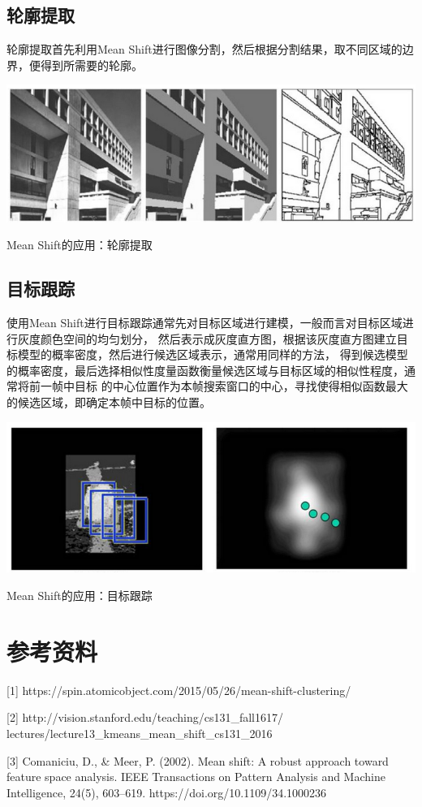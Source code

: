 \documentclass{article}
\begin{document}
\subsection{轮廓提取}
轮廓提取首先利用Mean Shift进行图像分割，然后根据分割结果，取不同区域的边界，便得到所需要的轮廓。
\begin{center}
    \includegraphics[width=\textwidth]{Images/profile.png}

    Mean Shift的应用：轮廓提取
\end{center}


\subsection{目标跟踪}
使用Mean Shift进行目标跟踪通常先对目标区域进行建模，一般而言对目标区域进行灰度颜色空间的均匀划分，
然后表示成灰度直方图，根据该灰度直方图建立目标模型的概率密度，然后进行候选区域表示，通常用同样的方法，
得到候选模型的概率密度，最后选择相似性度量函数衡量候选区域与目标区域的相似性程度，通常将前一帧中目标
的中心位置作为本帧搜索窗口的中心，寻找使得相似函数最大的候选区域，即确定本帧中目标的位置。
\begin{center}
    \includegraphics[width=\textwidth]{Images/tracking.png}

    Mean Shift的应用：目标跟踪
\end{center}

\section{参考资料}
[1] https://spin.atomicobject.com/2015/05/26/mean-shift-clustering/ 

[2] http://vision.stanford.edu/teaching/cs131\_fall1617/
lectures/lecture13\_kmeans\_mean\_shift\_cs131\_2016 

[3] Comaniciu, D., \& Meer, P. (2002). Mean shift: A robust 
approach toward feature space analysis. IEEE Transactions on 
Pattern Analysis and Machine Intelligence, 24(5), 603–619. https://doi.org/10.1109/34.1000236 
\end{document}
